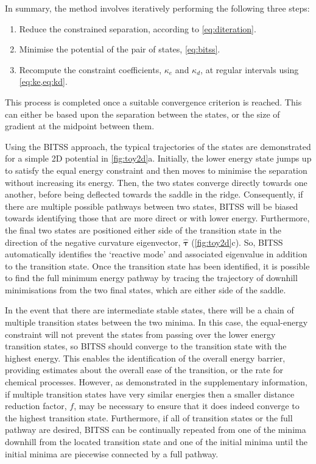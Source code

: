 \documentclass[twocolumn,10pt]{revtex4}
\begin{document}
In summary, the method involves iteratively performing the following three steps:
\begin{enumerate}
  \item Reduce the constrained separation, according to \cref{eq:diteration}.
  \item Minimise the potential of the pair of states, \cref{eq:bitss}.
  \item Recompute the constraint coefficients, $\kappa_e$ and $\kappa_d$, at regular intervals using \cref{eq:ke,eq:kd}.
\end{enumerate}
This process is completed once a suitable convergence criterion is reached.
This can either be based upon the separation between the states, or the size of gradient at the midpoint between them.

Using the BITSS approach, the typical trajectories of the states are demonstrated for a simple 2D potential in \cref{fig:toy2d}a.
Initially, the lower energy state jumps up to satisfy the equal energy constraint and then moves to minimise the separation without increasing its energy.
Then, the two states converge directly towards one another, before being deflected towards the saddle in the ridge.
Consequently, if there are multiple possible pathways between two states, BITSS will be biased towards identifying those that are more direct or with lower energy.
Furthermore, the final two states are positioned either side of the transition state in the direction of the negative curvature eigenvector, $\bm{\hat{\tau}}$ (\cref{fig:toy2d}c).
So, BITSS automatically identifies the `reactive mode' and associated eigenvalue in addition to the transition state.
Once the transition state has been identified, it is possible to find the full minimum energy pathway by tracing the trajectory of downhill minimisations from the two final states, which are either side of the saddle.

In the event that there are intermediate stable states, there will be a chain of multiple transition states between the two minima.
In this case, the equal-energy constraint will not prevent the states from passing over the lower energy transition states, so BITSS should converge to the transition state with the highest energy.
This enables the identification of the overall energy barrier, providing estimates about the overall ease of the transition, or the rate for chemical processes.
However, as demonstrated in the supplementary information, if multiple transition states have very similar energies then a smaller distance reduction factor, $f$, may be necessary to ensure that it does indeed converge to the highest transition state.
Furthermore, if all of transition states or the full pathway are desired, BITSS can be continually repeated from one of the minima downhill from the located transition state and one of the initial minima until the initial minima are piecewise connected by a full pathway.
\end{document}
